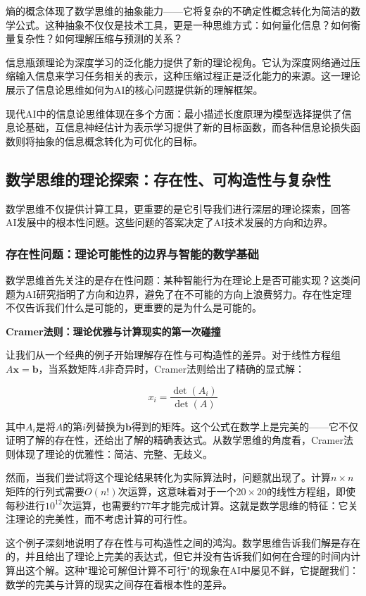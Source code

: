 熵的概念体现了数学思维的抽象能力——它将复杂的不确定性概念转化为简洁的数学公式。这种抽象不仅仅是技术工具，更是一种思维方式：如何量化信息？如何衡量复杂性？如何理解压缩与预测的关系？

信息瓶颈理论为深度学习的泛化能力提供了新的理论视角。它认为深度网络通过压缩输入信息来学习任务相关的表示，这种压缩过程正是泛化能力的来源。这一理论展示了信息论思维如何为AI的核心问题提供新的理解框架。

现代AI中的信息论思维体现在多个方面：最小描述长度原理为模型选择提供了信息论基础，互信息神经估计为表示学习提供了新的目标函数，而各种信息论损失函数则将抽象的信息概念转化为可优化的目标。

\subsection{数学思维的理论探索：存在性、可构造性与复杂性}

数学思维不仅提供计算工具，更重要的是它引导我们进行深层的理论探索，回答AI发展中的根本性问题。这些问题的答案决定了AI技术发展的方向和边界。

\subsubsection{存在性问题：理论可能性的边界与智能的数学基础}

数学思维首先关注的是存在性问题：某种智能行为在理论上是否可能实现？这类问题为AI研究指明了方向和边界，避免了在不可能的方向上浪费努力。存在性定理不仅告诉我们什么是可能的，更重要的是为什么是可能的。

\textbf{Cramer法则：理论优雅与计算现实的第一次碰撞}

让我们从一个经典的例子开始理解存在性与可构造性的差异。对于线性方程组$A\mathbf{x} = \mathbf{b}$，当系数矩阵$A$非奇异时，Cramer法则给出了精确的显式解：

$$x_i = \frac{\det(A_i)}{\det(A)}$$

其中$A_i$是将$A$的第$i$列替换为$\mathbf{b}$得到的矩阵。这个公式在数学上是完美的——它不仅证明了解的存在性，还给出了解的精确表达式。从数学思维的角度看，Cramer法则体现了理论的优雅性：简洁、完整、无歧义。

然而，当我们尝试将这个理论结果转化为实际算法时，问题就出现了。计算$n \times n$矩阵的行列式需要$O(n!)$次运算，这意味着对于一个$20 \times 20$的线性方程组，即使每秒进行$10^{12}$次运算，也需要约$77$年才能完成计算。这就是数学思维的特征：它关注理论的完美性，而不考虑计算的可行性。

这个例子深刻地说明了存在性与可构造性之间的鸿沟。数学思维告诉我们解是存在的，并且给出了理论上完美的表达式，但它并没有告诉我们如何在合理的时间内计算出这个解。这种"理论可解但计算不可行"的现象在AI中屡见不鲜，它提醒我们：数学的完美与计算的现实之间存在着根本性的差异。

